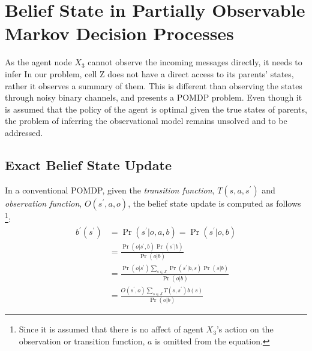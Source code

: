 
\section{Belief State in Partially Observable Markov Decision Processes}
As the agent node $ X_{3} $ cannot observe the incoming messages directly, it needs to infer In our problem, cell Z does not have a direct access to its parents' states, rather it observes a summary of them. This is different than observing the states through noisy binary channels, and presents a POMDP problem. Even though it is assumed that the policy of the agent is optimal given the true states of parents, the problem of inferring the observational model remains unsolved and to be addressed.

\subsection{Exact Belief State Update}

In a conventional POMDP, given the \textit{transition function}, $ T(s, a, s^{\prime})$  and \textit{observation function}, $ O(s^{\prime}, a, o) $, the belief state update is computed as follows \cite{Kaelbling2011} \footnote{Since it is assumed that there is no affect of agent $ X_{3} $'s action on the observation or transition function, $ a $ is omitted from the equation.}:
\begin{equation}
\begin{aligned}
b^{\prime}\left(s^{\prime}\right) &=\operatorname{Pr}\left(s^{\prime} | o, a, b\right) =\operatorname{Pr}\left(s^{\prime} | o, b\right) \\
&=\frac{\operatorname{Pr}\left(o | s^{\prime}, b\right) \operatorname{Pr}\left(s^{\prime} | b\right)}{\operatorname{Pr}(o | b)} \\
&=\frac{\operatorname{Pr}\left(o | s^{\prime}\right) \sum_{s \in \mathcal{S}} \operatorname{Pr}\left(s^{\prime} | b, s\right) \operatorname{Pr}(s | b)}{\operatorname{Pr}(o | b)} \\
&=\frac{O\left(s^{\prime}, o\right) \sum_{s \in \mathcal{S}} T\left(s, s^{\prime}\right) b(s)}{\operatorname{Pr}(o | b)}
\end{aligned}
\label{eq:b}
\end{equation}

